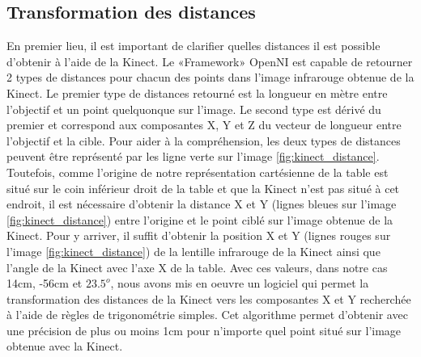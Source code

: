 \subsection{Transformation des distances}
En premier lieu, il est important de clarifier quelles distances il est possible d'obtenir à l'aide de la Kinect. Le «Framework» OpenNI est capable de retourner 2 types de distances pour chacun des points dans l'image infrarouge obtenue de la Kinect. Le premier type de distances retourné est la longueur en mètre entre l'objectif et un point quelquonque sur l'image. Le second type est dérivé du premier et correspond aux composantes X, Y et Z du vecteur de longueur entre l'objectif et la cible. Pour aider à la compréhension, les deux types de distances peuvent être représenté par les ligne verte sur l'image \ref{fig:kinect_distance}. Toutefois, comme l'origine de notre représentation cartésienne de la table est situé sur le coin inférieur droit de la table et que la Kinect n'est pas situé à cet endroit, il est nécessaire d'obtenir la distance X et Y (lignes bleues sur l'image \ref{fig:kinect_distance}) entre l'origine et le point ciblé sur l'image obtenue de la Kinect. Pour y arriver, il suffit d'obtenir la position X et Y (lignes rouges sur l'image \ref{fig:kinect_distance}) de la lentille infrarouge de la Kinect ainsi que l'angle de la Kinect avec l'axe X de la table. Avec ces valeurs, dans notre cas 14cm, -56cm et $23.5^o$, nous avons mis en oeuvre un logiciel qui permet la transformation des distances de la Kinect vers les composantes X et Y recherchée à l'aide de règles de trigonométrie simples. Cet algorithme permet d'obtenir avec une précision de plus ou moins 1cm pour n'importe quel point situé sur l'image obtenue avec la Kinect. 


